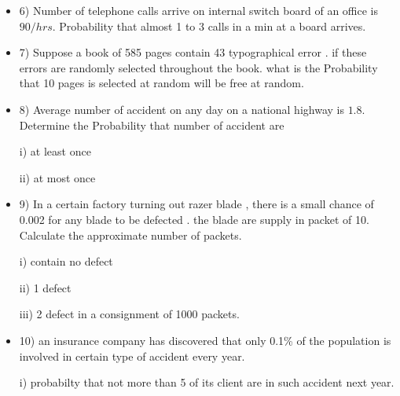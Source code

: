 \documentclass{article}
\begin{document}
\begin{itemize}
    

\item 6) Number of telephone calls arrive on internal switch board of an office is $90/hrs$.  Probability  that almost 1 to 3 calls in a min at a board arrives.

\item 7) Suppose a book of 585 pages contain 43 typographical error . if these errors are randomly selected throughout the book. what is the  Probability  that 10 pages is selected at random will be free at random.

\item 8) Average number of accident on any day on a national highway is $1.8$. Determine the Probability that number of accident are 



i) at least once 

ii) at most once 

\item 9) In a certain factory turning out razer blade , there is a small chance of 0.002
for any blade to be defected . the blade are supply in packet of 10. Calculate the approximate number of packets.


i) contain no defect

ii) 1 defect 

iii) 2 defect in a  consignment of 1000 packets.

\item 10) an insurance company has discovered that only 0.1\% of the population is involved in certain type of accident every year.

i) probabilty that not more than 5 of its client are in such accident next year.
\end{itemize}
\end{document}
